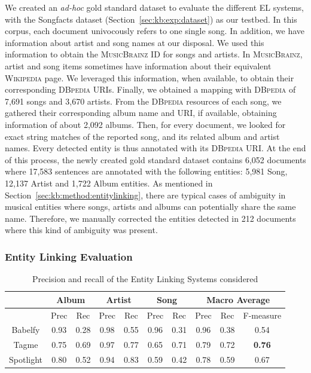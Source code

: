 We created an \textit{ad-hoc} gold standard dataset to evaluate the different EL systems, with the Songfacts dataset (Section~\ref{sec:kb:exp:dataset}) as our testbed. In this corpus, each document univocously refers to one single song. In addition, we have information about artist and song names at our disposal. We used this information to obtain the \textsc{MusicBrainz} ID for songs and artists. In \textsc{MusicBrainz}, artist and song items sometimes have information about their equivalent \textsc{Wikipedia} page. We leveraged this information, when available, to obtain their corresponding \textsc{DBpedia} URIs. Finally, we obtained a mapping with \textsc{DBpedia} of 7,691 songs and 3,670 artists. From the \textsc{DBpedia} resources of each song, we gathered their corresponding album name and URI, if available, obtaining information of about 2,092 albums. Then, for every document, we looked for exact string matches of the reported song, and its related album and artist names. Every detected entity is thus annotated with its \textsc{DBpedia} URI. At the end of this process, the newly created gold standard dataset contains 6,052 documents where 17,583 sentences are annotated with the following entities: 5,981 Song, 12,137 Artist and 1,722 Album entities. As mentioned in Section~\ref{sec:kb:method:entitylinking}, there are typical cases of ambiguity in musical entities where songs, artists and albums can potentially share the same name. Therefore, we manually corrected the entities detected in 212 documents where this kind of ambiguity was present.


\subsubsection{Entity Linking Evaluation}

\begin{table}[ht!]
\scriptsize
\centering
	\begin{tabular}{ | c | c | c | c | c | c | c | c | c | c | }
	\hline
& \multicolumn{2}{|c|}{Album} & \multicolumn{2}{|c|}{Artist} & \multicolumn{2}{|c|}{Song} & \multicolumn{3}{|c|}{Macro Average}  \\
\hline
	& Prec & Rec & Prec & Rec & Prec & Rec & Prec & Rec & F-measure \\
	\hline
Babelfy & 0.93 & 0.28 & 0.98 & 0.55 & 0.96 & 0.31 & 0.96 & 0.38 & 0.54 \\
Tagme & 0.75 & 0.69 & 0.97 & 0.77 & 0.65 & 0.71 & 0.79 & 0.72 & \textbf{0.76} \\
Spotlight & 0.80 & 0.52 & 0.94 & 0.83 & 0.59 & 0.42 & 0.78 & 0.59 & 0.67 \\
\hline
	\end{tabular}
	\caption{Precision and recall of the Entity Linking Systems considered}
	\label{tbl:kb:res_categories}
\end{table}


